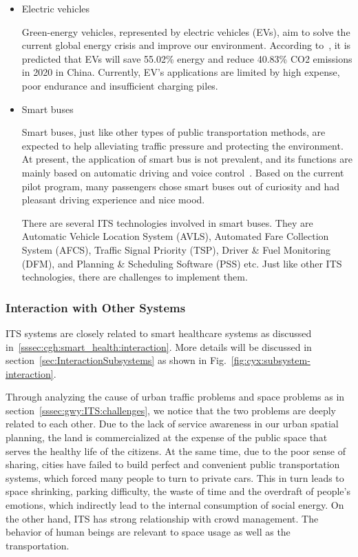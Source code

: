 \documentclass[letterpaper, twocolumn, 10pt, conference]{IEEEtran}
\begin{document}
\begin{itemize}

\item Electric vehicles

Green-energy vehicles, represented by electric vehicles (EVs), aim to solve the current global energy crisis and improve our environment. According to~\cite{zhou2013development}, it is predicted that EVs will save 55.02\% energy and reduce 40.83\% CO2 emissions in 2020 in China. Currently, EV’s applications are limited by high expense, poor endurance and insufficient charging piles.


\item Smart buses

Smart buses, just like other types of public transportation methods, are expected to help alleviating traffic pressure and protecting the environment. At present, the application of smart bus is not prevalent, and its functions are mainly based on automatic driving and voice control~\cite{lam2014autonomous}. 
Based on the current pilot program, many passengers chose smart buses out of curiosity and had pleasant driving experience and nice mood. 

There are several ITS technologies involved in smart buses. They are  Automatic Vehicle Location System (AVLS), Automated Fare Collection System (AFCS), Traffic Signal Priority (TSP), Driver \& Fuel Monitoring (DFM), and Planning \& Scheduling Software (PSS) etc. Just like other ITS technologies, there are challenges to implement them.

\end{itemize}


\subsubsection{Interaction with Other Systems}
\label{sssec:gwy:ITS:interaction}

ITS systems are closely related to smart healthcare systems as discussed in~\ref{sssec:cgh:smart_health:interaction}. 
More details will be discussed in section~\ref{sec:InteractionSubsystems} as shown in Fig.~\ref{fig:cyx:subsystem-interaction}. 

Through analyzing the cause of urban traffic problems and space problems as in section~\ref{sssec:gwy:ITS:challenges}, we notice that the two problems are deeply related to each other. Due to the lack of service awareness in our urban spatial planning, the land is commercialized at the expense of the public space that serves the healthy life of the citizens. 
At the same time, due to the poor sense of sharing, cities have failed to build perfect and convenient public transportation systems, which forced many people to turn to private cars. This in turn leads to space shrinking, parking difficulty, the waste of time and the overdraft of people's emotions, which indirectly lead to the internal consumption of social energy. 
On the other hand, ITS has strong relationship with crowd management. The behavior of human beings are relevant to space usage as well as the transportation. 
\end{document}
